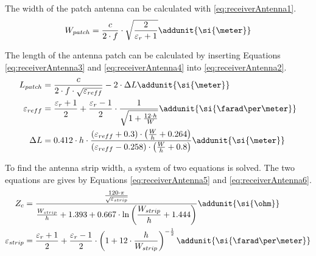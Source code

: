 The width of the patch antenna can be calculated with \autoref{eq:receiverAntenna1}. 
\begin{align} 
W_{patch} = \frac{c}{2 \cdot f} \cdot \sqrt{\frac{2}{\varepsilon_{r} + 1}} \addunit{\si{\meter}} \label{eq:receiverAntenna1} 
\end{align}
\startexplain
{}
\stopexplain

The length of the antenna patch can be calculated by inserting Equations \ref{eq:receiverAntenna3} and \ref{eq:receiverAntenna4} into \autoref{eq:receiverAntenna2}. 
\begin{subequations}
\begin{align} 
L_{patch} &= \frac{c}{2 \cdot f \cdot \sqrt{\varepsilon_{reff}}} - 2\cdot \Delta L \addunit{\si{\meter}} \label{eq:receiverAntenna2} \\
\varepsilon_{reff} &= \frac{\varepsilon_{r} + 1}{2} + \frac{\varepsilon_{r} - 1}{2}\cdot \frac{1}{\sqrt{1+ \frac{12\cdot h}{W}}} \addunit{\si{\farad\per\meter}} \label{eq:receiverAntenna3} \\
 \Delta L &= 0.412\cdot h \cdot \frac{\left(\varepsilon_{reff} + 0.3\right)\cdot \left(\frac{W}{h} +0.264\right)}{\left(\varepsilon_{reff} - 0.258\right)\cdot\left(\frac{W}{h} +0.8 \right)} \addunit{\si{\meter}} \label{eq:receiverAntenna4} 
\end{align}
\end{subequations} 
\startexplain
{}
\stopexplain

To find the antenna strip width, a system of two equations is solved. The two equations are gives by Equations \ref{eq:receiverAntenna5} and \ref{eq:receiverAntenna6}.
\begin{subequations}
\begin{align} 
Z_{c} &= \frac{\frac{120\cdot \pi}{\sqrt{\varepsilon_{strip}}}}{\frac{W_{strip}}{h}+1.393+0.667\cdot \ln\left(\dfrac{W_{strip}}{h}+1.444\right)} \addunit{\si{\ohm}} \label{eq:receiverAntenna5} \\
\varepsilon_{strip} &= \dfrac{\varepsilon_{r}+1}{2}+\frac{\varepsilon_{r}-1}{2}\cdot \left(1+12\cdot \frac{h}{W_{strip}}\right)^{-\frac{1}{2}} \addunit{\si{\farad\per\meter}} \label{eq:receiverAntenna6} 
\end{align}
\end{subequations} 
\startexplain
{}
\stopexplain

